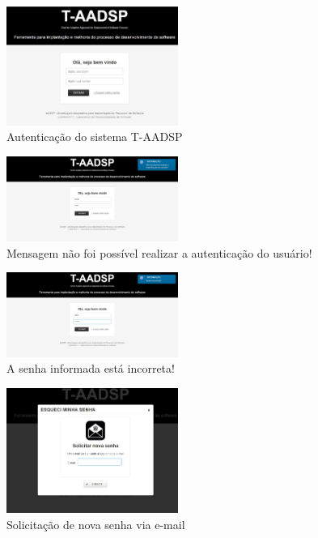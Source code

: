 \documentclass{acm_proc_article-sp}
\begin{document}
\begin{appendices}
\begin{figure}[h]
\centering %
\includegraphics[width=0.5\textwidth]{RF_autenticacao.jpg} %
\caption{Autenticação do sistema T-AADSP}
\end{figure}

\begin{figure}[h]
\centering %
\includegraphics[width=0.5\textwidth]{RF_autenticacao_dados_incorretos.jpg} %
\caption{Mensagem não foi possível realizar a autenticação do usuário! }
\end{figure}

\begin{figure}[h]
\centering %
\includegraphics[width=0.5\textwidth]{RF_autenticacao_senha_incorreta.jpg} %
\caption{A senha informada está incorreta! }
\end{figure}

\begin{figure}[h]
\centering %
\includegraphics[width=0.5\textwidth]{RF_autenticacao_solicitar_nova_senha.jpg} %
\caption{Solicitação de nova senha via e-mail }
\end{figure}


\end{appendices}
\end{document}
